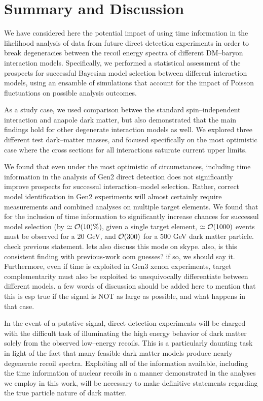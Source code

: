 \documentclass[11pt]{article}
\newcommand{\vgColor}{magenta}
\newcommand{\vg}[1]{{\color{\vgColor} #1}}
\begin{document}
\section{Summary and Discussion}\label{sec:conclusion}
We have considered here the potential impact of using time information in the likelihood analysis of data from future direct detection experiments in order to break degeneracies between the recoil energy spectra of different DM--baryon interaction models. Specifically, we performed a statistical assessment of the prospects for successful Bayesian model selection between different interaction models, using an ensamble of simulations that account for the impact of Poisson fluctuations on possible analysis outcomes. 

As a study case, we used comparison betwee the standard spin--independent interaction and anapole dark matter, but also demonstrated that the main findings hold for other degenerate interaction models as well. We explored three different test dark--matter masses, and focused specifically on the most optimistic case where the cross sections for all interactions saturate current upper limits. 

We found that even under the most optimistic of circumstances, including time information in the analysis of Gen2 direct detection does not significantly improve prospects for successul interaction--model selection. Rather, correct model identification in Gen2 experiments will almost certainly require measurements and combined analyses on multiple target elements. We found that for the inclusion of time information to significantly increase chances for successul model selection (by $\simeq {\cal O}(10)\%$), given a single target element, $\simeq {\cal O}(1000)$ events must be observed for a 20 GeV, and ${\cal O}(300)$ for a 500 GeV dark matter particle. \vg{check previous statement. lets also discuss this mode on skype. also, is this consistent finding with previous-work oom guesses? if so, we should say it.} Furthermore, even if time is exploited in Gen3 xenon experiments, target complementarity must also be exploited to unequivocally differentiate between different models. \vg{a few words of discussion should be added here to mention that this is esp true if the signal is NOT as large as possible, and what happens in that case.}

In the event of a putative signal, direct detection experiments will be charged with the difficult task of illuminating the high energy behavior of dark matter solely from the observed low--energy recoils. This is a particularly daunting task in light of the fact that many feasible dark matter models produce nearly degenerate recoil spectra. Exploiting all of the information available, including the time information of nuclear recoils in a manner demonstrated in the analyses we employ in this work, will be necessary to make definitive statements regarding the true particle nature of dark matter.
\end{document}
